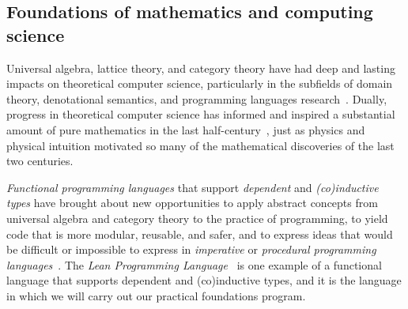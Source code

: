 \documentclass[11pt]{amsart}  %
\begin{document}
\subsection{Foundations of mathematics and computing science}
Universal algebra, lattice theory, and category theory have had deep and lasting impacts on theoretical computer science, particularly in the subfields of domain theory, denotational semantics, and programming languages research~\cite{MR1249550}. Dually, progress in theoretical computer science has informed and inspired a substantial amount of pure mathematics in the last half-century~\cite{MR3662915,MR3725758,MR2765040,MR3233442,MR1321662, MR1249550}, %
just as physics and physical intuition motivated so many of the mathematical discoveries of the last two centuries.


\emph{Functional programming languages} that support \emph{dependent} and \emph{(co)inductive types} have brought about new opportunities to apply abstract concepts from universal algebra and category theory to the practice of programming, to yield code that is more modular, reusable, and safer, and to express ideas that would be difficult or impossible to express in \emph{imperative} or \emph{procedural programming languages}~\cite[Chs. 5 \& 10]{baueroplss:2018,hughes:1989,chiusano:2014}. 
The \emph{Lean Programming Language}~\cite{lean} is one example of a functional language that supports dependent and (co)inductive types, and it is the language in which we will carry out our practical foundations program.
\end{document}

